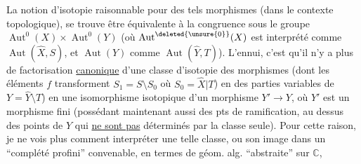 La notion d'isotopie raisonnable pour des
tels morphismes (dans le contexte topologique),
se trouve être équivalente à la congruence
sous le groupe $\operatorname{Aut}^0(X)\times\operatorname{Aut}^0(Y)$
(où $\operatorname{Aut}^{\deleted{\unsure{0}}}(X)$ est interprété comme $\operatorname{Aut}(\widehat X,S)$,
et $\operatorname{Aut}(Y)$ comme $\operatorname{Aut}(\widehat Y,T)$). L'ennui,
c'est qu'il n'y a plus de factorisation
\uline{canonique} d'une classe d'isotopie des
morphismes  (dont les éléments  $f$
transforment $S_1=S\setminus S_0$ où $S_0=\widehat X|T$) en
des parties variables de $Y=\widehat Y\setminus T$) en
une isomorphisme  isotopique  
 d'un morphisme $Y'\longrightarrow Y$, où $Y'$ est un
morphisme fini (possédant maintenant aussi
 des pts de ramification, au dessus des
points de $Y$ qui \uline{ne sont pas} déterminés
par la classe seule). Pour cette raison,
je ne vois plus comment interpréter une
telle classe, ou son image dans un
 ``complété profini'' convenable,
en termes de géom. alg. ``abstraite'' sur $\mathbb C$,
